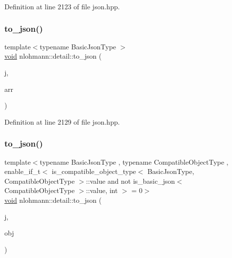 Definition at line 2123 of file json.\+hpp.

\mbox{\label{namespacenlohmann_1_1detail_aa0fd1b5788e9ba37e31da43dda738cb5}} 
\subsubsection{\texorpdfstring{to\_json()}{to\_json()}\hspace{0.1cm}{\footnotesize\ttfamily [11/17]}}
{\footnotesize\ttfamily template$<$typename Basic\+Json\+Type $>$ \\
\mbox{\hyperlink{namespacenlohmann_1_1detail_a59fca69799f6b9e366710cb9043aa77d}{void}} nlohmann\+::detail\+::to\+\_\+json (\begin{DoxyParamCaption}\item[{Basic\+Json\+Type \&}]{j,  }\item[{typename Basic\+Json\+Type\+::array\+\_\+t \&\&}]{arr }\end{DoxyParamCaption})}



Definition at line 2129 of file json.\+hpp.

\mbox{\label{namespacenlohmann_1_1detail_a24c9c12f3839c94e09532f08de85e949}} 
\subsubsection{\texorpdfstring{to\_json()}{to\_json()}\hspace{0.1cm}{\footnotesize\ttfamily [12/17]}}
{\footnotesize\ttfamily template$<$typename Basic\+Json\+Type , typename Compatible\+Object\+Type , enable\+\_\+if\+\_\+t$<$ is\+\_\+compatible\+\_\+object\+\_\+type$<$ Basic\+Json\+Type, Compatible\+Object\+Type $>$\+::value and not is\+\_\+basic\+\_\+json$<$ Compatible\+Object\+Type $>$\+::value, int $>$  = 0$>$ \\
\mbox{\hyperlink{namespacenlohmann_1_1detail_a59fca69799f6b9e366710cb9043aa77d}{void}} nlohmann\+::detail\+::to\+\_\+json (\begin{DoxyParamCaption}\item[{Basic\+Json\+Type \&}]{j,  }\item[{const Compatible\+Object\+Type \&}]{obj }\end{DoxyParamCaption})}



